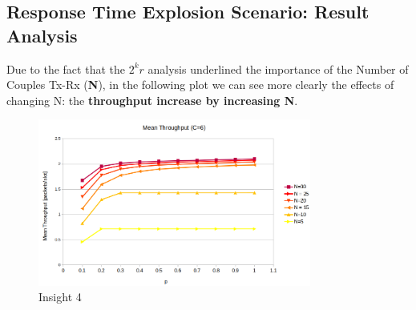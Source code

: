 \newpage

\subsection{Response Time Explosion Scenario: Result Analysis}
Due to the fact that the $2^{k}r$ analysis underlined the importance of the Number of Couples Tx-Rx (\textbf{N}), in the following plot we can see more clearly the effects of changing N: the \textbf{throughput increase by increasing N}. 
 
\begin{figure}[H]
	\centering
	\includegraphics[width=0.8\textwidth]{img/MeanThroughputBufferExplosion.png}
	\caption{Insight 4}
	\label{img: insight4}
\end{figure}

